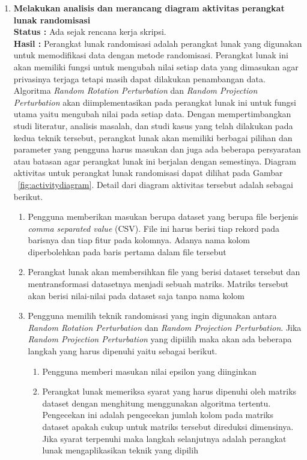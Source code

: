 \documentclass[a4paper,twoside]{article}
\begin{document}
\begin{enumerate}
		\item \textbf{Melakukan analisis dan merancang diagram aktivitas perangkat lunak randomisasi}\\
		{\bf Status :} Ada sejak rencana kerja skripsi.\\
		{\bf Hasil :} Perangkat lunak randomisasi adalah perangkat lunak yang digunakan untuk memodifikasi data dengan metode randomisasi. Perangkat lunak ini akan memiliki fungsi untuk mengubah nilai setiap data yang dimasukan agar privasinya terjaga tetapi masih dapat dilakukan penambangan data. Algoritma \textit{Random Rotation Perturbation} dan \textit{Random Projection Perturbation} akan diimplementasikan pada perangkat lunak ini untuk fungsi utama yaitu mengubah nilai pada setiap data. Dengan mempertimbangkan studi literatur, analisis masalah, dan studi kasus yang telah dilakukan pada kedua teknik tersebut, perangkat lunak akan memiliki berbagai pilihan dan parameter yang pengguna harus masukan dan juga ada beberapa persyaratan atau batasan agar perangkat lunak ini berjalan dengan semestinya. Diagram aktivitas untuk perangkat lunak randomisasi dapat dilihat pada Gambar ~\ref{fig:activitydiagram}. Detail dari diagram aktivitas tersebut adalah sebagai berikut.
		\begin{enumerate}
			\item Pengguna memberikan masukan berupa dataset yang berupa file berjenis \textit{comma separated value} (CSV). File ini harus berisi tiap rekord pada barisnya dan tiap fitur pada kolomnya. Adanya nama kolom diperbolehkan pada baris pertama dalam file tersebut
			\item Perangkat lunak akan membersihkan file yang berisi dataset tersebut dan mentransformasi datasetnya menjadi sebuah matriks. Matriks tersebut akan berisi nilai-nilai pada dataset saja tanpa nama kolom
			\item Pengguna memilih teknik randomisasi yang ingin digunakan antara \textit{Random Rotation Perturbation} dan \textit{Random Projection Perturbation}. Jika \textit{Random Projection Perturbation} yang dipiilih maka akan ada beberapa langkah yang harus dipenuhi yaitu sebagai berikut.
			\begin{enumerate}
				\item Pengguna memberi masukan nilai epsilon yang diinginkan
				\item Perangkat lunak memeriksa syarat yang harus dipenuhi oleh matriks dataset dengan menghitung menggunakan algoritma tertentu. Pengecekan ini adalah pengecekan jumlah kolom pada matriks dataset apakah cukup untuk matriks tersebut direduksi dimensinya. Jika syarat terpenuhi maka langkah selanjutnya adalah perangkat lunak mengaplikasikan teknik yang dipilih

\end{enumerate}
\end{enumerate}
\end{enumerate}
\end{document}
